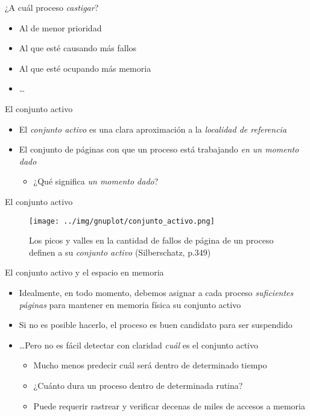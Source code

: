 \documentclass[presentation]{beamer}
\begin{document}
\begin{frame}[label={sec:org5d5eb7d}]{¿A cuál proceso \emph{castigar}?}
\begin{itemize}
\item Al de menor prioridad
\item Al que esté causando más fallos
\item Al que esté ocupando más memoria
\item \ldots{}
\end{itemize}
\end{frame}

\begin{frame}[label={sec:org20cf31b}]{El conjunto activo}
\begin{itemize}
\item El \emph{conjunto activo} es una clara aproximación a la \emph{localidad de
referencia}
\item El conjunto de páginas con que un proceso está trabajando \emph{en un
momento dado}
\begin{itemize}
\item ¿Qué significa \emph{un momento dado}?
\end{itemize}
\end{itemize}
\end{frame}

\begin{frame}[label={sec:orgb2cc563}]{El conjunto activo}
\begin{figure}[htbp]
\centering
\texttt{[image: ../img/gnuplot/conjunto\_activo.png]}
\caption{Los picos y valles en la cantidad de fallos de página de un proceso definen a su \emph{conjunto activo}  (Silberschatz, p.349)}
\end{figure}
\end{frame}

\begin{frame}[label={sec:org3409a2c}]{El conjunto activo y el espacio en memoria}
\begin{itemize}
\item Idealmente, en todo momento, debemos asignar a cada proceso
\emph{suficientes páginas} para mantener en memoria física su conjunto
activo
\item Si no es posible hacerlo, el proceso es buen candidato para ser
suspendido
\item \ldots{}Pero no es fácil detectar con claridad \emph{cuál} es el conjunto activo
\begin{itemize}
\item Mucho menos predecir cuál será dentro de determinado tiempo
\item ¿Cuánto dura un proceso dentro de determinada rutina?
\item Puede requerir rastrear y verificar decenas de miles de accesos a
memoria
\end{itemize}
\end{itemize}
\end{frame}
\end{document}

